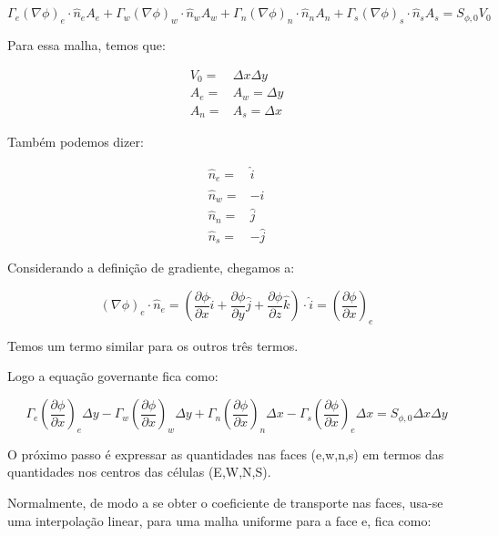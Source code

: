 \begin{equation}
    \Gamma_e (\nabla \phi)_e \cdot \hat{n}_e A_e + \Gamma_w (\nabla \phi)_w \cdot \hat{n}_w A_w + \Gamma_n (\nabla \phi)_n \cdot \hat{n}_n A_n + \Gamma_s (\nabla \phi)_s \cdot \hat{n}_s A_s = S_{\phi,0} V_0
\end{equation}

Para essa malha, temos que:

\begin{eqnarray}
    V_0 =& \Delta x \Delta y\\
    A_e =& A_w = \Delta y\\
    A_n =& A_s = \Delta x
\end{eqnarray}

Também podemos dizer:

\begin{eqnarray}
    \hat{n}_e =& \hat{i}\\
    \hat{n}_w =& -\hat{i}\\
    \hat{n}_n =& \hat{j}\\
    \hat{n}_s =& -\hat{j}
\end{eqnarray}

Considerando a definição de gradiente, chegamos a:

\begin{equation}
    (\nabla \phi)_e \cdot \hat{n}_e = \left( \frac{\partial \phi}{\partial x} \hat{i} + \frac{\partial \phi}{\partial y} \hat{j} + \frac{\partial \phi}{\partial z} \hat{k} \right) \cdot \hat{i} = \left( \frac{\partial \phi}{\partial x} \right)_e
\end{equation}

Temos um termo similar para os outros três termos.

Logo a equação governante fica como:

\begin{equation}
    \label{eq:2.29}
    \Gamma_e \left( \frac{\partial \phi}{\partial x} \right)_e \Delta y - \Gamma_w \left( \frac{\partial \phi}{\partial x} \right)_w \Delta y + \Gamma_n \left( \frac{\partial \phi}{\partial x} \right)_n \Delta x - \Gamma_s \left( \frac{\partial \phi}{\partial x} \right)_e \Delta x = S_{\phi,0} \Delta x \Delta y
\end{equation}

O próximo passo é expressar as quantidades nas faces (e,w,n,s) em termos das quantidades nos centros das células (E,W,N,S).

Normalmente, de modo a se obter o coeficiente de transporte nas faces, usa-se uma interpolação linear, para uma malha uniforme para a face e, fica como:

